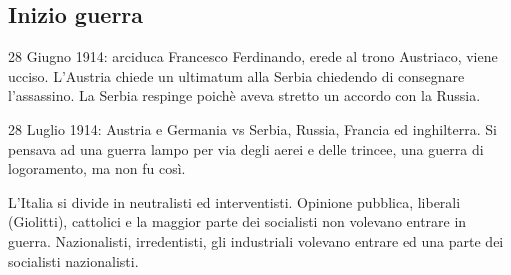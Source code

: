 \documentclass{article}
\begin{document}
    \subsection{Inizio guerra}
    28 Giugno 1914: arciduca Francesco Ferdinando, erede al trono Austriaco, viene ucciso.
    L'Austria chiede un ultimatum alla Serbia chiedendo di consegnare l'assassino. La Serbia respinge poichè aveva stretto
    un accordo con la Russia.

    28 Luglio 1914: Austria e Germania vs Serbia, Russia, Francia ed inghilterra.
    Si pensava ad una guerra lampo per via degli aerei e delle trincee, una guerra di logoramento, ma non fu così.

    L'Italia si divide in neutralisti ed interventisti.
    Opinione pubblica, liberali (Giolitti), cattolici e la maggior parte dei socialisti non volevano entrare in guerra.
    Nazionalisti, irredentisti, gli industriali volevano entrare ed una parte dei socialisti nazionalisti.
\end{document}
